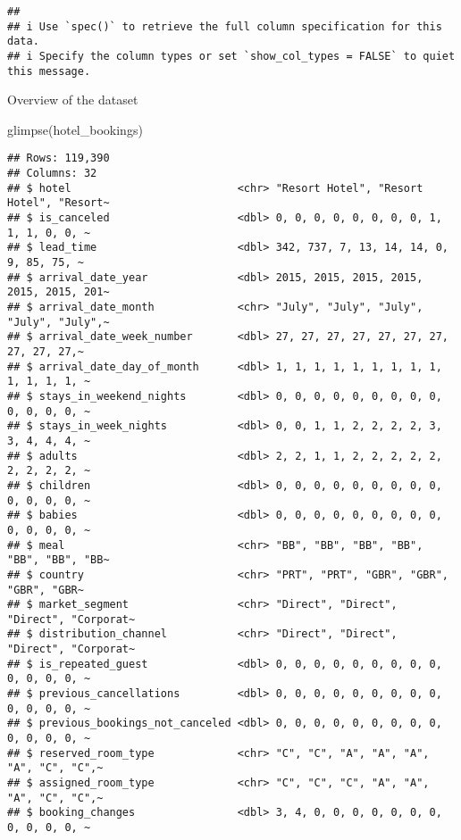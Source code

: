 \documentclass[
]{article}
\newenvironment{Shaded}{\begin{snugshade}}{\end{snugshade}}
\newcommand{\FunctionTok}[1]{\textcolor[rgb]{0.00,0.00,0.00}{#1}}
\newcommand{\NormalTok}[1]{#1}
\begin{document}
\begin{verbatim}
## 
## i Use `spec()` to retrieve the full column specification for this data.
## i Specify the column types or set `show_col_types = FALSE` to quiet this message.
\end{verbatim}

Overview of the dataset

\begin{Shaded}
\begin{Highlighting}[]
\FunctionTok{glimpse}\NormalTok{(hotel\_bookings)}
\end{Highlighting}
\end{Shaded}

\begin{verbatim}
## Rows: 119,390
## Columns: 32
## $ hotel                          <chr> "Resort Hotel", "Resort Hotel", "Resort~
## $ is_canceled                    <dbl> 0, 0, 0, 0, 0, 0, 0, 0, 1, 1, 1, 0, 0, ~
## $ lead_time                      <dbl> 342, 737, 7, 13, 14, 14, 0, 9, 85, 75, ~
## $ arrival_date_year              <dbl> 2015, 2015, 2015, 2015, 2015, 2015, 201~
## $ arrival_date_month             <chr> "July", "July", "July", "July", "July",~
## $ arrival_date_week_number       <dbl> 27, 27, 27, 27, 27, 27, 27, 27, 27, 27,~
## $ arrival_date_day_of_month      <dbl> 1, 1, 1, 1, 1, 1, 1, 1, 1, 1, 1, 1, 1, ~
## $ stays_in_weekend_nights        <dbl> 0, 0, 0, 0, 0, 0, 0, 0, 0, 0, 0, 0, 0, ~
## $ stays_in_week_nights           <dbl> 0, 0, 1, 1, 2, 2, 2, 2, 3, 3, 4, 4, 4, ~
## $ adults                         <dbl> 2, 2, 1, 1, 2, 2, 2, 2, 2, 2, 2, 2, 2, ~
## $ children                       <dbl> 0, 0, 0, 0, 0, 0, 0, 0, 0, 0, 0, 0, 0, ~
## $ babies                         <dbl> 0, 0, 0, 0, 0, 0, 0, 0, 0, 0, 0, 0, 0, ~
## $ meal                           <chr> "BB", "BB", "BB", "BB", "BB", "BB", "BB~
## $ country                        <chr> "PRT", "PRT", "GBR", "GBR", "GBR", "GBR~
## $ market_segment                 <chr> "Direct", "Direct", "Direct", "Corporat~
## $ distribution_channel           <chr> "Direct", "Direct", "Direct", "Corporat~
## $ is_repeated_guest              <dbl> 0, 0, 0, 0, 0, 0, 0, 0, 0, 0, 0, 0, 0, ~
## $ previous_cancellations         <dbl> 0, 0, 0, 0, 0, 0, 0, 0, 0, 0, 0, 0, 0, ~
## $ previous_bookings_not_canceled <dbl> 0, 0, 0, 0, 0, 0, 0, 0, 0, 0, 0, 0, 0, ~
## $ reserved_room_type             <chr> "C", "C", "A", "A", "A", "A", "C", "C",~
## $ assigned_room_type             <chr> "C", "C", "C", "A", "A", "A", "C", "C",~
## $ booking_changes                <dbl> 3, 4, 0, 0, 0, 0, 0, 0, 0, 0, 0, 0, 0, ~

\end{verbatim}
\end{document}
